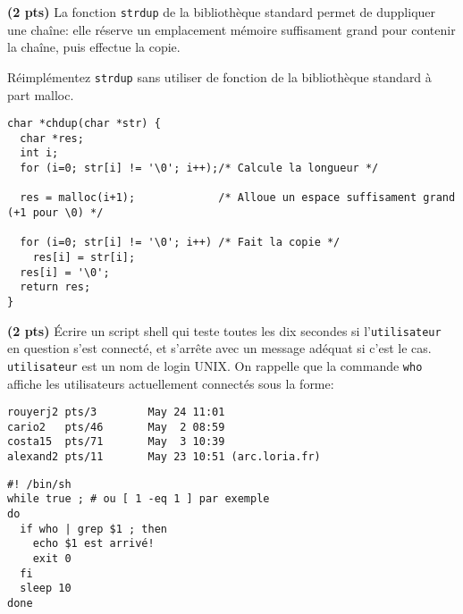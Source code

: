 \documentclass[10pt]{article}
\begin{document}
\begin{Exercice} \textbf{(2 pts)}
  La fonction \texttt{strdup} de la bibliothèque standard permet de duppliquer
  une chaîne: elle réserve un emplacement mémoire suffisament grand pour
  contenir la chaîne, puis effectue la copie.

  \Question Réimplémentez \texttt{strdup} sans utiliser de fonction de la
  bibliothèque standard à part malloc.
\begin{Reponse}
  \begin{Verbatim}
char *chdup(char *str) {
  char *res;
  int i;
  for (i=0; str[i] != '\0'; i++);/* Calcule la longueur */
  
  res = malloc(i+1);             /* Alloue un espace suffisament grand (+1 pour \0) */

  for (i=0; str[i] != '\0'; i++) /* Fait la copie */
    res[i] = str[i];
  res[i] = '\0';
  return res;
}
  \end{Verbatim}
\end{Reponse}
\end{Exercice}

\begin{Exercice} \textbf{(2 pts)}
  Écrire un script shell  qui teste toutes les dix
  secondes si l'\texttt{utilisateur} en question s'est connecté, et s'arrête
  avec un message adéquat si c'est le cas. \texttt{utilisateur} est un nom de
  login UNIX. On rappelle que la commande \texttt{who} affiche les utilisateurs
  actuellement connectés sous la forme:
  \begin{Verbatim}
rouyerj2 pts/3        May 24 11:01
cario2   pts/46       May  2 08:59
costa15  pts/71       May  3 10:39
alexand2 pts/11       May 23 10:51 (arc.loria.fr)    
  \end{Verbatim}

\end{Exercice}
\begin{Reponse}
  \begin{Verbatim}
#! /bin/sh
while true ; # ou [ 1 -eq 1 ] par exemple
do
  if who | grep $1 ; then 
    echo $1 est arrivé!
    exit 0
  fi
  sleep 10
done    
  \end{Verbatim}
\end{Reponse}
\end{document}
